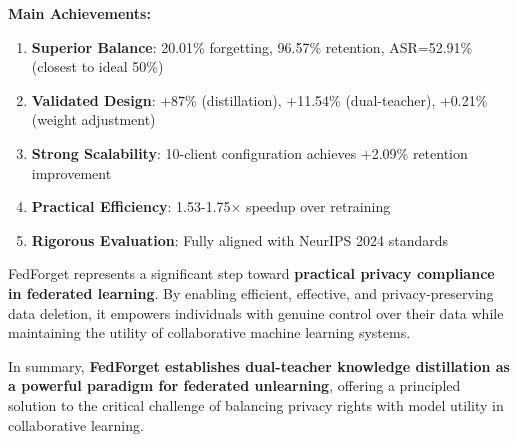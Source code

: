 \documentclass[10pt,twocolumn]{article}
\begin{document}
\textbf{Main Achievements:}

\begin{enumerate}
\item \textbf{Superior Balance}: 20.01\% forgetting, 96.57\% retention, ASR=52.91\% (closest to ideal 50\%)
\item \textbf{Validated Design}: +87\% (distillation), +11.54\% (dual-teacher), +0.21\% (weight adjustment)
\item \textbf{Strong Scalability}: 10-client configuration achieves +2.09\% retention improvement
\item \textbf{Practical Efficiency}: 1.53-1.75$\times$ speedup over retraining
\item \textbf{Rigorous Evaluation}: Fully aligned with NeurIPS 2024 standards
\end{enumerate}

FedForget represents a significant step toward \textbf{practical privacy compliance in federated learning}. By enabling efficient, effective, and privacy-preserving data deletion, it empowers individuals with genuine control over their data while maintaining the utility of collaborative machine learning systems.

In summary, \textbf{FedForget establishes dual-teacher knowledge distillation as a powerful paradigm for federated unlearning}, offering a principled solution to the critical challenge of balancing privacy rights with model utility in collaborative learning.
\end{document}
